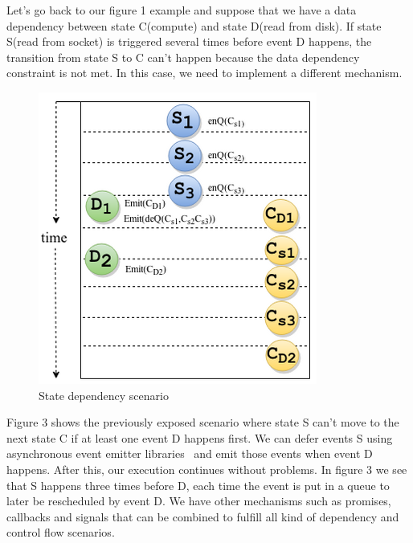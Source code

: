 \documentclass[10pt,reprint]{socc14}
\begin{document}
Let’s go back to our figure 1 example and suppose that we have a data dependency between state C(compute) and state D(read from disk). If state S(read from socket) is triggered several times before event D happens, the transition from state S to C can’t happen because the data dependency constraint is not met. In this case, we need to implement a different mechanism. 

\begin{figure}[h]	
	\centering
	\includegraphics[scale=0.6]{StateDependency}
	\caption{State dependency scenario}
\end{figure}


Figure 3 shows the previously exposed scenario where state S can’t move to the next state C if at least one event D happens first.  We can defer events S using asynchronous event emitter libraries~\cite{Caolan} and emit those events when event D happens. After this, our execution continues without problems. In figure 3 we see that S happens three times before D, each time the event is put in a queue to later be rescheduled by event D. We have other mechanisms such as promises, callbacks and signals that can be combined to fulfill all kind of dependency and control flow scenarios.

\end{document}
